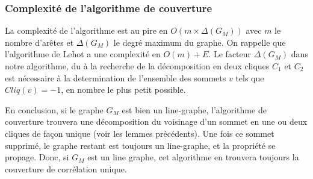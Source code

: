 \subsubsection{Complexit\'e de l'algorithme de couverture}
La complexit\'e de l'algorithme est au pire en $O(m \times \Delta(G_M))$ avec $m$ le nombre d'ar\^etes et $\Delta(G_M)$ le degr\'e maximum du graphe.
On rappelle que l'algorithme de Lehot \cite{decompositionEnCliques} a une complexit\'e en $O(m) +E$. 
Le facteur $\Delta(G_M)$ dans notre algorithme, du \`a la recherche de la d\'ecomposition en deux cliques $C_1$ et $C_2$ est n\'ecessaire \`a la determination de l'ensemble des sommets $v$ tels que $Cliq(v) = -1$, en nombre le plus petit possible.
\newline

En conclusion, si le graphe $G_M$ est bien un line-graphe, l'algorithme  de couverture trouvera une d\'ecomposition du voisinage d'un sommet en une ou deux cliques de fa\c con unique (voir les lemmes pr\'ec\'edents). 
Une fois ce sommet supprim\'e, le graphe restant est toujours un line-graphe, et la propri\'et\'e se propage.
Donc, si $G_M$ est un line graphe, cet algorithme en trouvera toujours la couverture de corr\'elation unique.
